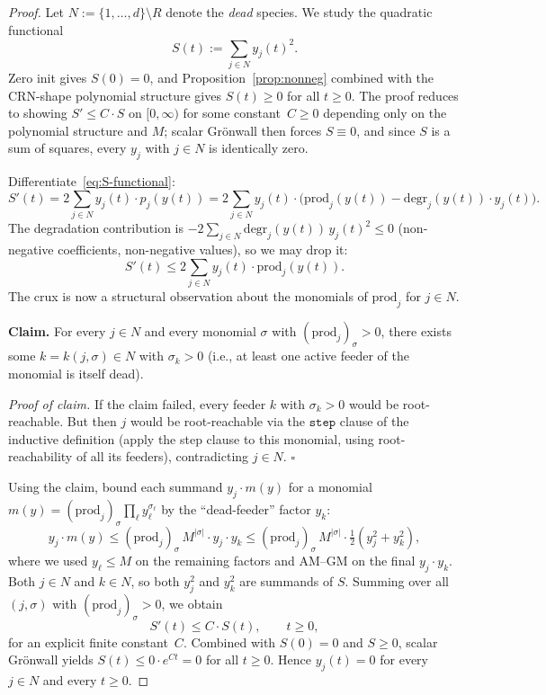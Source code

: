 \documentclass[11pt]{article}
\newcommand{\prodpoly}{\mathrm{prod}}
\newcommand{\degrpoly}{\mathrm{degr}}
\begin{document}
\begin{proof}
Let $N := \{1, \ldots, d\} \setminus R$ denote the \emph{dead} species. We
study the quadratic functional
\begin{equation}\label{eq:S-functional}
  S(t) := \sum_{j \in N} y_j(t)^2.
\end{equation}
Zero init gives $S(0) = 0$, and Proposition~\ref{prop:nonneg} combined with
the CRN-shape polynomial structure gives $S(t) \ge 0$ for all $t \ge 0$. The
proof reduces to showing $S' \le C \cdot S$ on $[0, \infty)$ for some
constant~$C \ge 0$ depending only on the polynomial structure and $M$;
scalar Gr\"onwall then forces $S \equiv 0$, and since $S$ is a sum of
squares, every $y_j$ with $j \in N$ is identically zero.

Differentiate~\eqref{eq:S-functional}:
\[
  S'(t) = 2 \sum_{j \in N} y_j(t) \cdot p_j(y(t))
        = 2 \sum_{j \in N} y_j(t) \cdot \bigl( \prodpoly_j(y(t)) -
            \degrpoly_j(y(t)) \cdot y_j(t) \bigr).
\]
The degradation contribution is $-2 \sum_{j \in N} \degrpoly_j(y(t))\, y_j(t)^2
\le 0$ (non-negative coefficients, non-negative values), so we may drop it:
\begin{equation}\label{eq:S-prime-bound}
  S'(t) \le 2 \sum_{j \in N} y_j(t) \cdot \prodpoly_j(y(t)).
\end{equation}
The crux is now a structural observation about the monomials of
$\prodpoly_j$ for $j \in N$.

\smallskip
\noindent\textbf{Claim.} For every $j \in N$ and every monomial $\sigma$ with
$(\prodpoly_j)_\sigma > 0$, there exists some $k = k(j, \sigma) \in N$ with
$\sigma_k > 0$ (i.e., at least one active feeder of the monomial is itself
dead).

\smallskip
\noindent\emph{Proof of claim.} If the claim failed, every feeder $k$ with
$\sigma_k > 0$ would be root-reachable. But then $j$ would be root-reachable
via the $\texttt{step}$ clause of the inductive definition (apply the step
clause to this monomial, using root-reachability of all its feeders),
contradicting $j \in N$. \hfill$\square$

\smallskip
Using the claim, bound each summand $y_j \cdot m(y)$ for a monomial
$m(y) = (\prodpoly_j)_\sigma \prod_\ell y_\ell^{\sigma_\ell}$ by the
``dead-feeder'' factor $y_k$:
\[
  y_j \cdot m(y) \le (\prodpoly_j)_\sigma \, M^{|\sigma|} \cdot y_j \cdot y_k
  \le (\prodpoly_j)_\sigma \, M^{|\sigma|} \cdot \tfrac{1}{2}(y_j^2 + y_k^2),
\]
where we used $y_\ell \le M$ on the remaining factors and AM--GM on the final
$y_j \cdot y_k$. Both $j \in N$ and $k \in N$, so both $y_j^2$ and $y_k^2$
are summands of $S$. Summing over all $(j, \sigma)$ with
$(\prodpoly_j)_\sigma > 0$, we obtain
\[
  S'(t) \le C \cdot S(t), \qquad t \ge 0,
\]
for an explicit finite constant~$C$. Combined with $S(0) = 0$ and
$S \ge 0$, scalar Gr\"onwall yields $S(t) \le 0 \cdot e^{C t} = 0$ for all
$t \ge 0$. Hence $y_j(t) = 0$ for every $j \in N$ and every $t \ge 0$.
\end{proof}
\end{document}
